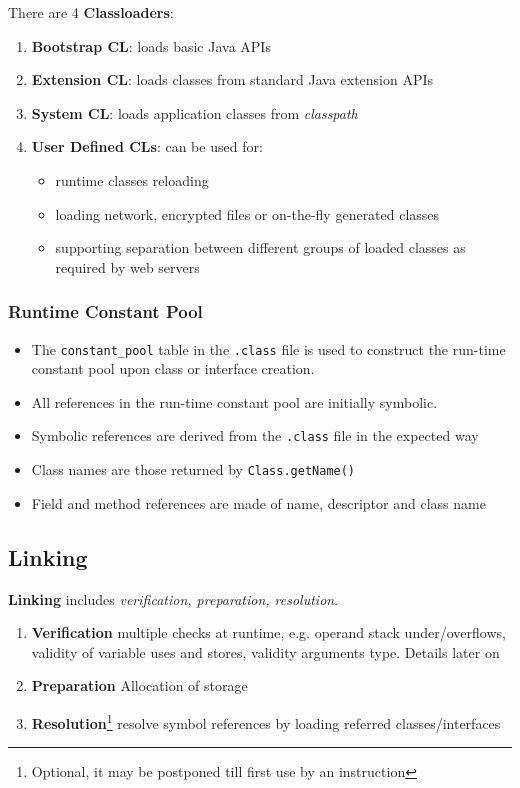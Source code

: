 There are 4 \textbf{Classloaders}:
\begin{enumerate}
    \item \textbf{Bootstrap CL}: loads basic Java APIs
    \item \textbf{Extension CL}: loads classes from standard Java extension APIs
    \item \textbf{System CL}: loads application classes from \textit{classpath} 
    \item \textbf{User Defined CLs}: can be used for:
    \begin{itemize}
        \item runtime classes reloading
        \item loading network, encrypted files or on-the-fly generated classes
        \item supporting separation between different groups of loaded classes as required by web servers
    \end{itemize}
\end{enumerate}

\subsubsection{Runtime Constant Pool}

\begin{itemize}
	\item The \lstinline|constant_pool| table in the \texttt{.class} file is
	      used to construct the run-time constant pool
	      upon class or interface creation.
	\item All references in the run-time constant pool are
	      initially symbolic.
	\item Symbolic references are derived from
	      the \texttt{.class} file in the expected way
	\item Class names are those returned by
	      \lstinline|Class.getName()|
	\item Field and method references are made of name,
	      descriptor and class name
\end{itemize}

\subsection{Linking}
\textbf{Linking} includes \textit{verification, preparation, resolution}.
\begin{enumerate}
    \item \textbf{Verification} multiple checks at runtime, e.g. operand stack under/overflows, validity of variable uses and stores, validity arguments type.
    Details later on
    \item \textbf{Preparation} Allocation of storage 
    \item \textbf{Resolution}\footnote{Optional, it may be postponed till first use by an instruction} resolve symbol references by loading referred classes/interfaces
\end{enumerate}

